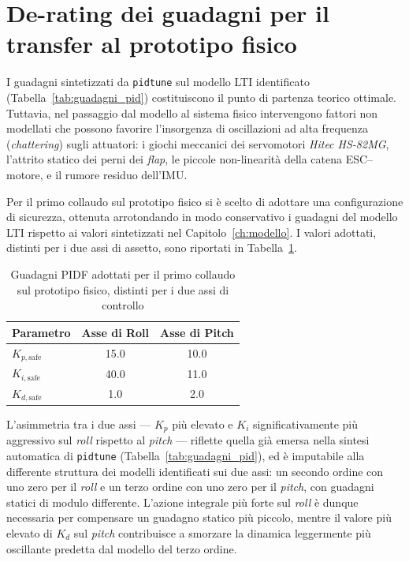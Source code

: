 \documentclass[11pt]{report}
\begin{document}
	\section{De-rating dei guadagni per il transfer al prototipo fisico}
	\label{sec:derating}
	
	I guadagni sintetizzati da \texttt{pidtune} sul modello LTI identificato (Tabella~\ref{tab:guadagni_pid}) costituiscono il punto di partenza teorico ottimale. Tuttavia, nel passaggio dal modello al sistema fisico intervengono fattori non modellati che possono favorire l'insorgenza di oscillazioni ad alta frequenza (\textit{chattering}) sugli attuatori: i giochi meccanici dei servomotori \textit{Hitec HS-82MG}, l'attrito statico dei perni dei \textit{flap}, le piccole non-linearità della catena ESC--motore, e il rumore residuo dell'IMU.
	
	Per il primo collaudo sul prototipo fisico si è scelto di adottare una configurazione di sicurezza, ottenuta arrotondando in modo conservativo i guadagni del modello LTI rispetto ai valori sintetizzati nel Capitolo~\ref{ch:modello}. I valori adottati, distinti per i due assi di assetto, sono riportati in Tabella~\ref{tab:guadagni_derated}.
	
	\begin{table}[H]
		\centering
		\begin{tabular}{lcc}
			\toprule
			\textbf{Parametro} & \textbf{Asse di Roll} & \textbf{Asse di Pitch} \\
			\midrule
			$K_{p,\text{safe}}$ & 15.0 & 10.0 \\
			$K_{i,\text{safe}}$ & 40.0 & 11.0 \\
			$K_{d,\text{safe}}$ & 1.0  & 2.0  \\
			\bottomrule
		\end{tabular}
		\caption{Guadagni PIDF adottati per il primo collaudo sul prototipo fisico, distinti per i due assi di controllo}
		\label{tab:guadagni_derated}
	\end{table}
	
	L'asimmetria tra i due assi --- $K_p$ più elevato e $K_i$ significativamente più aggressivo sul \textit{roll} rispetto al \textit{pitch} --- riflette quella già emersa nella sintesi automatica di \texttt{pidtune} (Tabella~\ref{tab:guadagni_pid}), ed è imputabile alla differente struttura dei modelli identificati sui due assi: un secondo ordine con uno zero per il \textit{roll} e un terzo ordine con uno zero per il \textit{pitch}, con guadagni statici di modulo differente. L'azione integrale più forte sul \textit{roll} è dunque necessaria per compensare un guadagno statico più piccolo, mentre il valore più elevato di $K_d$ sul \textit{pitch} contribuisce a smorzare la dinamica leggermente più oscillante predetta dal modello del terzo ordine.
	
\end{document}
